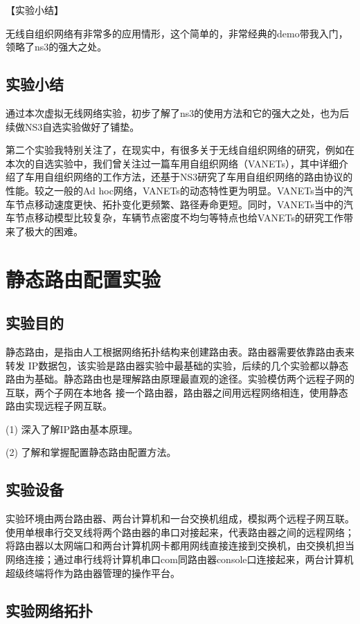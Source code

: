 \documentclass[lang=cn,11pt,a4paper,cite=authoryear]{elegantpaper}
\begin{document}
【实验小结】

无线自组织网络有非常多的应用情形，这个简单的，非常经典的demo带我入门，领略了ns3的强大之处。

\subsection{实验小结}

通过本次虚拟无线网络实验，初步了解了ns3的使用方法和它的强大之处，也为后续做NS3自选实验做好了铺垫。

第二个实验我特别关注了，在现实中，有很多关于无线自组织网络的研究，例如在本次的自选实验中，我们曾关注过一篇车用自组织网络（VANETs），其中详细介绍了车用自组织网络的工作方法，还基于NS3研究了车用自组织网络的路由协议的性能。较之一般的Ad hoc网络，VANETs的动态特性更为明显。VANETs当中的汽车节点移动速度更快、拓扑变化更频繁、路径寿命更短。同时，VANETs当中的汽车节点移动模型比较复杂，车辆节点密度不均匀等特点也给VANETs的研究工作带来了极大的困难。

\section{静态路由配置实验}
\subsection{实验目的}

静态路由，是指由人工根据网络拓扑结构来创建路由表。路由器需要依靠路由表来转发 IP数据包，该实验是路由器实验中最基础的实验，后续的几个实验都以静态路由为基础。静态路由也是理解路由原理最直观的途径。实验模仿两个远程子网的互联，两个子网在本地各 接一个路由器，路由器之间用远程网络相连，使用静态路由实现远程子网互联。

(1)	深入了解IP路由基本原理。

(2)	了解和掌握配置静态路由配置方法。

\subsection{实验设备}

实验环境由两台路由器、两台计算机和一台交换机组成，模拟两个远程子网互联。使用单根串行交叉线将两个路由器的串口对接起来，代表路由器之间的远程网络；将路由器以太网端口和两台计算机网卡都用网线直接连接到交换机，由交换机担当网络连接；通过串行线将计算机串口com同路由器console口连接起来，两台计算机超级终端将作为路由器管理的操作平台。

\subsection{实验网络拓扑}
\end{document}
